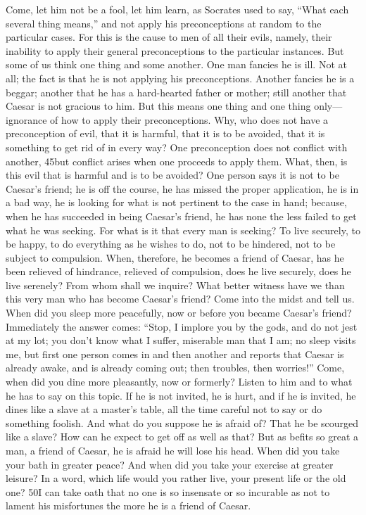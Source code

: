 Come, let him not be a fool, let him learn, as Socrates used to say, ``What each several thing means,'' and not apply his preconceptions at random to the particular cases. For this is the cause to men of all their evils, namely, their inability to apply their general preconceptions to the particular instances. But some of us think one thing and some another. One man fancies he is ill. Not at all; the fact is that he is not applying his preconceptions. Another fancies he is a beggar; another that he has a hard-hearted father or mother; still another that Caesar is not gracious to him. But this means one thing and one thing only—ignorance of how to apply their preconceptions. Why, who does not have a preconception of evil, that it is harmful, that it is to be avoided, that it is something to get rid of in every way? One preconception does not conflict with another, 45but conflict arises when one proceeds to apply them. What, then, is this evil that is harmful and is to be avoided? One person says it is not to be Caesar's friend; he is off the course, he has missed the proper application, he is in a bad way, he is looking for what is not pertinent to the case in hand; because, when he has succeeded in being Caesar's friend, he has none the less failed to get what he was seeking. For what is it that every man is seeking? To live securely, to be happy, to do everything as he wishes to do, not to be hindered, not to be subject to compulsion. When, therefore, he becomes a friend of Caesar, has he been relieved of hindrance, relieved of compulsion, does he live securely, does he live serenely? From whom shall we inquire? What better witness have we than this very man who has become Caesar's friend? Come into the midst and tell us. When did you sleep more peacefully, now or before you became Caesar's friend? Immediately the answer comes: ``Stop, I implore you by the gods, and do not jest at my lot; you don't know what I suffer, miserable man that I am; no sleep visits me, but first one person comes in and then another and reports that Caesar is already awake, and is already coming out; then troubles, then worries!'' Come, when did you dine more pleasantly, now or formerly? Listen to him and to what he has to say on this topic. If he is not invited, he is hurt, and if he is invited, he dines like a slave at a master's table, all the time careful not to say or do something foolish. And what do you suppose he is afraid of? That he be scourged like a slave? How can he expect to get off as well as that? But as befits so great a man, a friend of Caesar, he is afraid he will lose his head. When did you take your bath in greater peace? And when did you take your exercise at greater leisure? In a word, which life would you rather live, your present life or the old one? 50I can take oath that no one is so insensate or so incurable as not to lament his misfortunes the more he is a friend of Caesar.

